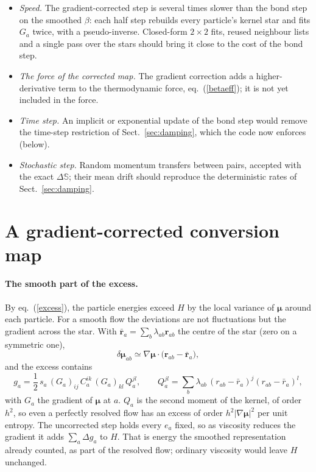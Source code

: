 \documentclass[11pt,aps,preprint,nofootinbib,superscriptaddress,tightenlines]{revtex4-2}
\def\st{\begin{equation}}
\def\stp{\end{equation}}
\def\Eq#1{eq.~(\ref{#1})}
\def\Sect#1{Sect.~\ref{#1}}
\let\oldparagraph\paragraph
\renewcommand{\paragraph}{\par\bigskip\oldparagraph}
\begin{document}
\begin{itemize}
\item \emph{Speed.}  The gradient-corrected step is several times slower than the
  bond step on the smoothed $\beta$: each half step rebuilds every particle's
  kernel star and fits $G_a$ twice, with a pseudo-inverse.  Closed-form $2\times2$
  fits, reused neighbour lists and a single pass over the stars should bring it
  close to the cost of the bond step.
\item \emph{The force of the corrected map.}  The gradient correction adds a
  higher-derivative term to the thermodynamic force,
  \Eq{betaeff}; it is not yet included in the force.
\item \emph{Time step.}  An implicit or exponential update of the bond step
  would remove the time-step restriction of \Sect{sec:damping}, which the code now
  enforces (below).
\item \emph{Stochastic step.}  Random momentum transfers between pairs,
  accepted with the exact $\Delta\mathbb S$; their mean drift should reproduce
  the deterministic rates of \Sect{sec:damping}.
\end{itemize}

\appendix
\section{A gradient-corrected conversion map}
\label{sec:grad}

\paragraph{The smooth part of the excess.}  By \Eq{excess}, the particle energies
exceed $H$ by the local variance of $\bm\mu$ around each particle.  For a smooth
flow the deviations are not fluctuations but the gradient across the star.  With
$\bar{\bm r}_a=\sum_b\lambda_{ab}\bm r_{ab}$ the centre of the star (zero on a
symmetric one),
\st
\delta\bm\mu_{ab}\simeq\nabla\bm\mu\cdot\big(\bm r_{ab}-\bar{\bm r}_a\big),
\stp
and the excess contains
\st
g_a=\frac12\,s_a\,(G_a)_{ij}\,C_a^{ik}\,(G_a)_{kl}\,Q_a^{jl},\qquad
Q_a^{jl}=\sum_b\lambda_{ab}\,(r_{ab}-\bar r_a)^j(r_{ab}-\bar r_a)^l ,
\label{ga}
\stp
with $G_a$ the gradient of $\bm\mu$ at $a$.  $Q_a$ is the second moment of the
kernel, of order $h^2$, so even a perfectly resolved flow has an excess of order
$h^2|\nabla\bm\mu|^2$ per unit entropy.  The uncorrected step holds every $e_a$
fixed, so as viscosity reduces the gradient it adds $\sum_a\Delta g_a$ to $H$.
That is energy the smoothed representation already counted, as part of the
resolved flow; ordinary viscosity would leave $H$ unchanged.
\end{document}
